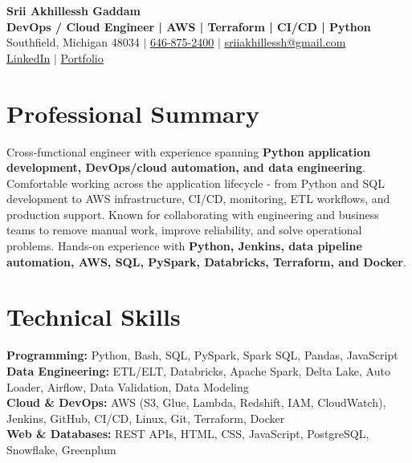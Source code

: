 \documentclass[letterpaper,10pt]{article}
\begin{document}
\fontsize{9.35pt}{10.45pt}\selectfont

\begin{center}
    {\LARGE \textbf{Srii Akhillessh Gaddam}} \\[-1pt]
    \textbf{DevOps / Cloud Engineer | AWS | Terraform | CI/CD | Python} \\[2pt]
    Southfield, Michigan 48034 $|$
    \href{tel:6468752400}{646-875-2400} $|$
    \href{mailto:sriiakhillessh@gmail.com}{sriiakhillessh@gmail.com} \\[1pt]
    \href{https://www.linkedin.com/in/srii-akhiilessh-gaddam-b48668191/}{LinkedIn} $|$
    \href{https://sriiakhillesshg.github.io/portfolio/}{Portfolio}
\end{center}
\vspace{-8pt}

\section{Professional Summary}
\small{Cross-functional engineer with experience spanning \textbf{Python application development, DevOps/cloud automation, and data engineering}. Comfortable working across the application lifecycle - from Python and SQL development to AWS infrastructure, CI/CD, monitoring, ETL workflows, and production support. Known for collaborating with engineering and business teams to remove manual work, improve reliability, and solve operational problems. Hands-on experience with \textbf{Python, Jenkins, data pipeline automation, AWS, SQL, PySpark, Databricks, Terraform, and Docker}.}

\section{Technical Skills}
\small{
\textbf{Programming:} Python, Bash, SQL, PySpark, Spark SQL, Pandas, JavaScript \\
\textbf{Data Engineering:} ETL/ELT, Databricks, Apache Spark, Delta Lake, Auto Loader, Airflow, Data Validation, Data Modeling \\
\textbf{Cloud \& DevOps:} AWS (S3, Glue, Lambda, Redshift, IAM, CloudWatch), Jenkins, GitHub, CI/CD, Linux, Git, Terraform, Docker \\
\textbf{Web \& Databases:} REST APIs, HTML, CSS, JavaScript, PostgreSQL, Snowflake, Greenplum
}
\end{document}
